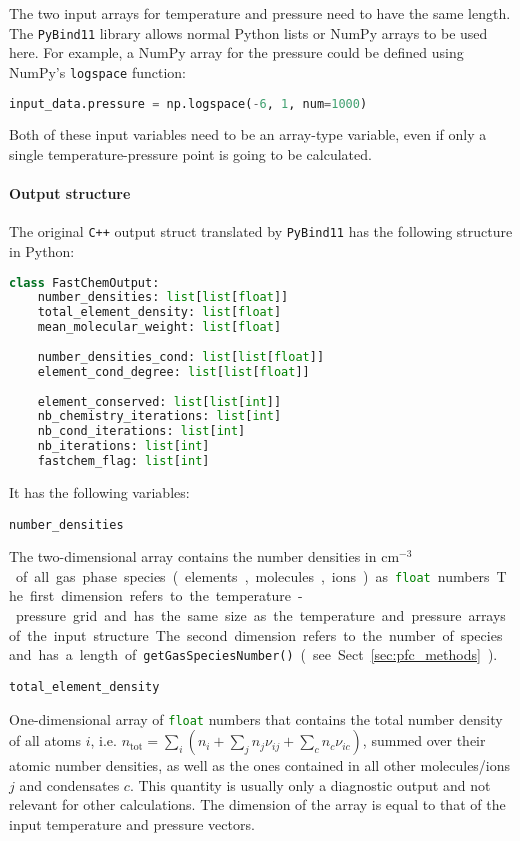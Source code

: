 \documentclass[numbers=noenddot]{aux/fcmanual}
\newcommand{\cpp}{\ttt{C++}\xspace}
\newcommand{\pb}{\texttt{PyBind11}\xspace}
\newcommand{\ttt}[1]{\texttt {#1}}
\begin{document}
The two input arrays for temperature and pressure need to have the same length. The \pb library allows normal Python lists or NumPy arrays to be used here. For example, a NumPy array for the pressure could be defined using NumPy's \lstinline!logspace! function:

\begin{lstlisting}[language=Python]
  input_data.pressure = np.logspace(-6, 1, num=1000)
\end{lstlisting}
Both of these input variables need to be an array-type variable, even if only a single temperature-pressure point is going to be calculated.



\paragraph{Output structure}

The original \cpp output struct translated by \pb has the following structure in Python:
\begin{lstlisting}[language=Python]
  class FastChemOutput:
    number_densities: list[list[float]]
    total_element_density: list[float]
    mean_molecular_weight: list[float]
	
    number_densities_cond: list[list[float]]
    element_cond_degree: list[list[float]]
	
    element_conserved: list[list[int]]
    nb_chemistry_iterations: list[int]
    nb_cond_iterations: list[int]
    nb_iterations: list[int]
    fastchem_flag: list[int]
\end{lstlisting}

It has the following variables:

\lstinline!number_densities!
\begin{addmargin}[25pt]{0pt}
	The two-dimensional array contains the number densities in \unit{cm$^{-3}$} of all gas phase species (elements, molecules, ions) as \lstinline[language=Python]!float! numbers. The first dimension refers to the temperature-pressure grid and has the same size as the temperature and pressure arrays of the input structure. The second dimension refers to the number of species and has a length of \lstinline!getGasSpeciesNumber()! (see Sect. \ref{sec:pfc_methods}).
\end{addmargin}

\bigbreak

\lstinline!total_element_density!
\begin{addmargin}[25pt]{0pt}
	One-dimensional array of \lstinline[language=Python]!float! numbers that contains the total number density of all atoms $i$, i.e. $n_\mathrm{tot} = \sum_i \left( n_i + \sum_j n_j \nu_{ij} + \sum_c n_c \nu_{ic} \right)$, summed over their atomic number densities, as well as the ones contained in all other molecules/ions $j$ and condensates $c$. This quantity is usually only a diagnostic output and not relevant for other calculations. The dimension of the array is equal to that of the input temperature and pressure vectors.
\end{addmargin}
\end{document}
